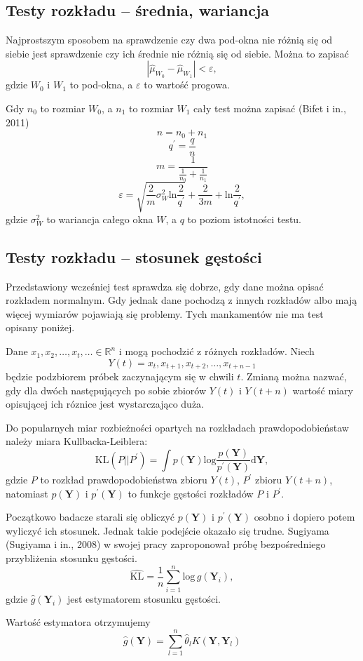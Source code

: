 \subsection{Testy rozkładu -- średnia, wariancja}
\label{sub:TestsMeanAndVar}
Najprostszym sposobem na sprawdzenie czy dwa pod-okna nie różnią się od siebie
jest sprawdzenie czy ich średnie nie różnią się od siebie.
Można to zapisać
$$ | \hat{\mu}_{W_{0}} - \hat{\mu}_{W_{1}} | < \varepsilon, $$
gdzie $W_{0}$ i $W_{1}$ to pod-okna, a $\varepsilon$ to wartość progowa.

Gdy $n_{0}$ to rozmiar $W_{0}$,
a $n_{1}$ to rozmiar $W_{1}$ cały test można zapisać (Bifet i in., 2011)
$$n = n_{0} + n_{1}$$
$$q^\prime = \frac{q}{n}$$
$$m=\frac{1}{\frac{1}{n_0}+\frac{1}{n_1}}$$
$$\varepsilon = \sqrt{\frac{2}{m} \sigma^{2}_{W} \mbox{ln}\frac{2}{q^\prime}} + \frac{2}{3m} + \mbox{ln}\frac{2}{q^\prime},$$
gdzie $\sigma^{2}_{W}$ to wariancja całego okna $W$,
a $q$ to poziom istotności testu.
\subsection{Testy rozkładu -- stosunek gęstości}
\label{sub:TestDensityRatio}
Przedstawiony wcześniej test sprawdza się dobrze,
gdy dane można opisać rozkładem normalnym.
Gdy jednak dane pochodzą z innych rozkładów albo mają więcej wymiarów pojawiają się problemy.
Tych mankamentów nie ma test opisany poniżej.

Dane $x_1,x_2,\ldots,x_t,\ldots \in \mathbb{R}^n$ i mogą pochodzić z różnych rozkładów.
Niech
$$ Y(t) = {x_t, x_{t+1}, x_{t+2}, \ldots, x_{t+n-1}}$$
będzie podzbiorem próbek zaczynającym się w chwili $t$.
Zmianą można nazwać,
gdy dla dwóch następujących po sobie zbiorów $Y(t)$ i $Y(t+n)$
wartość miary opisującej ich róznice jest wystarczająco duża.

Do popularnych miar rozbieżności opartych na rozkładach prawdopodobieństaw należy miara Kullbacka-Leiblera:
$$\mbox{KL}(P||P^\prime) = \int p(\textbf{Y}) \mbox{log}\frac{p(\textbf{Y})}{p^\prime(\textbf{Y})} \mbox{d}\textbf{Y},$$
gdzie $P$ to rozkład prawdopodobieństwa zbioru $Y(t)$,
$P^\prime$ zbioru $Y(t+n)$,
natomiast $p(\textbf{Y})$ i $p^\prime(\textbf{Y})$ to funkcje gęstości rozkładów $P$ i $P^\prime$.

Początkowo badacze starali się obliczyć $p(\textbf{Y})$ i $p^\prime(\textbf{Y})$ osobno
i dopiero potem wyliczyć ich stosunek.
Jednak takie podejście okazało się trudne.
Sugiyama (Sugiyama i in., 2008) w swojej pracy zaproponował próbę bezpośredniego przybliżenia stosunku gęstości.
$$\hat{\mbox{KL}} = \frac{1}{n} \sum\limits_{i=1}^n \mbox{log}\,\hat{g}(\textbf{Y}_i),$$
gdzie $\hat{g}(\textbf{Y}_i)$ jest estymatorem stosunku gęstości.

Wartość estymatora otrzymujemy
$$\hat{g}(\textbf{Y}) = \sum\limits_{l=1}^n \hat{\theta}_l K(\textbf{Y}, \textbf{Y}_l)$$
